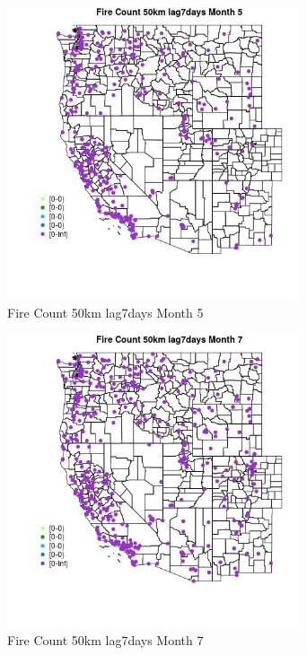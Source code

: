 \begin{figure} 
\centering  
\includegraphics[width=0.77\textwidth]{Code_Outputs/Report_ML_input_PM25_Step4_part_e_de_duplicated_aves_compiled_2019-05-18wNAs_MapObsMo5Fire_Count_50km_lag7days.jpg} 
\caption{\label{fig:Report_ML_input_PM25_Step4_part_e_de_duplicated_aves_compiled_2019-05-18wNAsMapObsMo5Fire_Count_50km_lag7days}Fire Count 50km lag7days Month 5} 
\end{figure} 
 

\begin{figure} 
\centering  
\includegraphics[width=0.77\textwidth]{Code_Outputs/Report_ML_input_PM25_Step4_part_e_de_duplicated_aves_compiled_2019-05-18wNAs_MapObsMo7Fire_Count_50km_lag7days.jpg} 
\caption{\label{fig:Report_ML_input_PM25_Step4_part_e_de_duplicated_aves_compiled_2019-05-18wNAsMapObsMo7Fire_Count_50km_lag7days}Fire Count 50km lag7days Month 7} 
\end{figure} 
 

